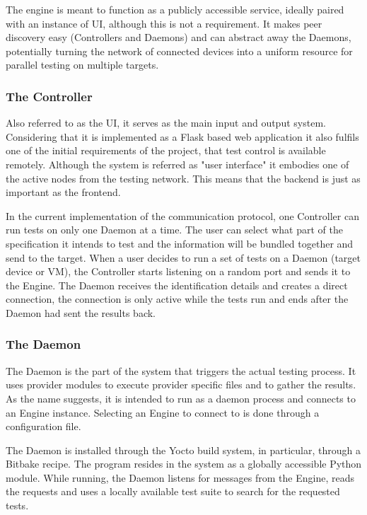 The engine is meant to function as a publicly accessible service, ideally paired with an instance of UI, although this is not a requirement. It makes peer discovery easy (Controllers and Daemons) and can abstract away the Daemons, potentially turning the network of connected devices into a uniform resource for parallel testing on multiple targets.

\subsubsection*{The Controller}
Also referred to as the UI, it serves as the main input and output system. Considering that it is implemented as a Flask based web application it also fulfils one of the initial requirements of the project, that test control is available remotely. Although the system is referred as "user interface" it embodies one of the active nodes from the testing network. This means that the backend is just as important as the frontend.

In the current implementation of the communication protocol, one Controller can run tests on only one Daemon at a time. The user can select what part of the specification it intends to test and the information will be bundled together and send to the target. When a user decides to run a set of tests on a Daemon (target device or VM), the Controller starts listening on a random port and sends it to the Engine. The Daemon receives the identification details and creates a direct connection, the connection is only active while the tests run and ends after the Daemon had sent the results back.

\subsubsection*{The Daemon}
The Daemon is the part of the system that triggers the actual testing process. It uses provider modules to execute provider specific files and to gather the results. As the name suggests, it is intended to run as a daemon process and connects to an Engine instance. Selecting an Engine to connect to is done through a configuration file.

The Daemon is installed through the Yocto build system, in particular, through a Bitbake recipe. The program resides in the system as a globally accessible Python module. While running, the Daemon listens for messages from the Engine, reads the requests and uses a locally available test suite to search for the requested tests. 

